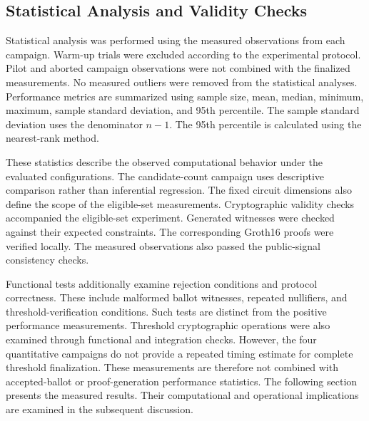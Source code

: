 \subsection{Statistical Analysis and Validity Checks}
\label{subsec:experimental-analysis}



Statistical analysis was performed using the measured
observations from each campaign. Warm-up trials were
excluded according to the experimental protocol.
Pilot and aborted campaign observations were not
combined with the finalized measurements. No measured
outliers were removed from the statistical analyses.
Performance metrics are summarized using sample size,
mean, median, minimum, maximum, sample standard
deviation, and 95th percentile. The sample standard
deviation uses the denominator $n-1$. The 95th
percentile is calculated using the nearest-rank
method.

These statistics describe the observed computational
behavior under the evaluated configurations.
The candidate-count campaign uses descriptive
comparison rather than inferential regression.
The fixed circuit dimensions also define the
scope of the eligible-set measurements.
Cryptographic validity checks accompanied the
eligible-set experiment. Generated witnesses
were checked against their expected constraints.
The corresponding Groth16 proofs were verified
locally. The measured observations also passed
the public-signal consistency checks.

Functional tests additionally examine rejection
conditions and protocol correctness. These
include malformed ballot witnesses, repeated
nullifiers, and threshold-verification conditions.
Such tests are distinct from the positive
performance measurements.
Threshold cryptographic operations were also
examined through functional and integration
checks. However, the four quantitative
campaigns do not provide a repeated timing
estimate for complete threshold finalization.
These measurements are therefore not combined
with accepted-ballot or proof-generation
performance statistics.
The following section presents the measured
results. Their computational and operational
implications are examined in the subsequent
discussion.

